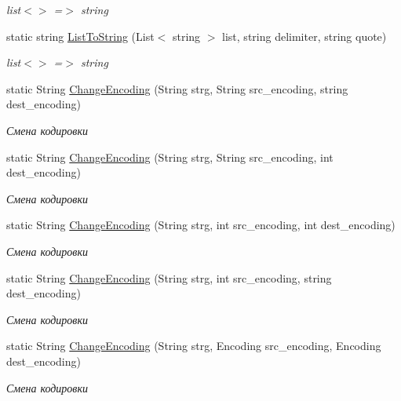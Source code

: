 \begin{DoxyCompactItemize}
\begin{DoxyCompactList}\small\item\em list$<$$>$ =$>$ string \end{DoxyCompactList}\item 
static string \hyperlink{class_common_facilities_1_1_common_ab6fcbef16905a00432881079786a78bf}{List\+To\+String} (List$<$ string $>$ list, string delimiter, string quote)
\begin{DoxyCompactList}\small\item\em list$<$$>$ =$>$ string \end{DoxyCompactList}\item 
static String \hyperlink{class_common_facilities_1_1_common_a17da98b3bd60d14b8b307af225e001a1}{Change\+Encoding} (String strg, String src\+\_\+encoding, string dest\+\_\+encoding)
\begin{DoxyCompactList}\small\item\em Смена кодировки \end{DoxyCompactList}\item 
static String \hyperlink{class_common_facilities_1_1_common_ad9aa0952e7edde5b2754db645d750864}{Change\+Encoding} (String strg, String src\+\_\+encoding, int dest\+\_\+encoding)
\begin{DoxyCompactList}\small\item\em Смена кодировки \end{DoxyCompactList}\item 
static String \hyperlink{class_common_facilities_1_1_common_a58a40261eccbb8d71a7d9a197b26a3c8}{Change\+Encoding} (String strg, int src\+\_\+encoding, int dest\+\_\+encoding)
\begin{DoxyCompactList}\small\item\em Смена кодировки \end{DoxyCompactList}\item 
static String \hyperlink{class_common_facilities_1_1_common_ac74544ee3d74e3472115ae40646eacdd}{Change\+Encoding} (String strg, int src\+\_\+encoding, string dest\+\_\+encoding)
\begin{DoxyCompactList}\small\item\em Смена кодировки \end{DoxyCompactList}\item 
static String \hyperlink{class_common_facilities_1_1_common_ad1be73e3342ed8fda9fb8a5b91d7a746}{Change\+Encoding} (String strg, Encoding src\+\_\+encoding, Encoding dest\+\_\+encoding)
\begin{DoxyCompactList}\small\item\em Смена кодировки \end{DoxyCompactList}\item 

\end{DoxyCompactItemize}
